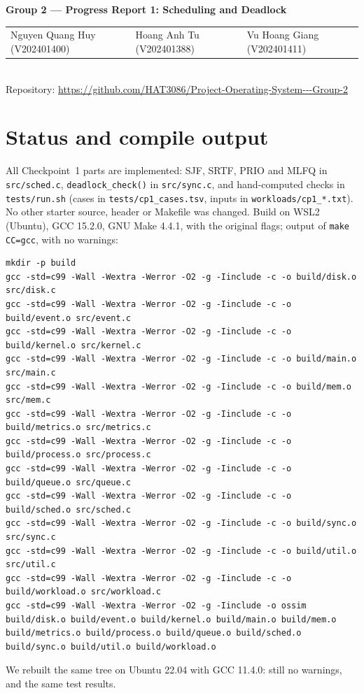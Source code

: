 \documentclass[10pt,a4paper]{article}
\newcommand{\code}[1]{\texttt{#1}}
\begin{document}
\begin{center}
{\Large\bfseries Group 2 --- Progress Report 1: Scheduling and Deadlock}\\[3pt]
\begin{tabular}{lll}
Nguyen Quang Huy (V202401400) & Hoang Anh Tu (V202401388) & Vu Hoang Giang (V202401411)
\end{tabular}\\[2pt]
Repository: \url{https://github.com/HAT3086/Project-Operating-System---Group-2}
\end{center}
\vspace{-6pt}

\section{Status and compile output}
All Checkpoint~1 parts are implemented: SJF, SRTF, PRIO and MLFQ in \code{src/sched.c},
\code{deadlock\_check()} in \code{src/sync.c}, and hand-computed checks in \code{tests/run.sh}
(cases in \code{tests/cp1\_cases.tsv}, inputs in \code{workloads/cp1\_*.txt}).
No other starter source, header or Makefile was changed. Build on WSL2 (Ubuntu), GCC 15.2.0, GNU Make 4.4.1, with the original
flags; output of \code{make CC=gcc}, with no warnings:
\begin{lstlisting}
mkdir -p build
gcc -std=c99 -Wall -Wextra -Werror -O2 -g -Iinclude -c -o build/disk.o src/disk.c
gcc -std=c99 -Wall -Wextra -Werror -O2 -g -Iinclude -c -o build/event.o src/event.c
gcc -std=c99 -Wall -Wextra -Werror -O2 -g -Iinclude -c -o build/kernel.o src/kernel.c
gcc -std=c99 -Wall -Wextra -Werror -O2 -g -Iinclude -c -o build/main.o src/main.c
gcc -std=c99 -Wall -Wextra -Werror -O2 -g -Iinclude -c -o build/mem.o src/mem.c
gcc -std=c99 -Wall -Wextra -Werror -O2 -g -Iinclude -c -o build/metrics.o src/metrics.c
gcc -std=c99 -Wall -Wextra -Werror -O2 -g -Iinclude -c -o build/process.o src/process.c
gcc -std=c99 -Wall -Wextra -Werror -O2 -g -Iinclude -c -o build/queue.o src/queue.c
gcc -std=c99 -Wall -Wextra -Werror -O2 -g -Iinclude -c -o build/sched.o src/sched.c
gcc -std=c99 -Wall -Wextra -Werror -O2 -g -Iinclude -c -o build/sync.o src/sync.c
gcc -std=c99 -Wall -Wextra -Werror -O2 -g -Iinclude -c -o build/util.o src/util.c
gcc -std=c99 -Wall -Wextra -Werror -O2 -g -Iinclude -c -o build/workload.o src/workload.c
gcc -std=c99 -Wall -Wextra -Werror -O2 -g -Iinclude -o ossim build/disk.o build/event.o build/kernel.o build/main.o build/mem.o build/metrics.o build/process.o build/queue.o build/sched.o build/sync.o build/util.o build/workload.o
\end{lstlisting}
We rebuilt the same tree on Ubuntu 22.04 with GCC 11.4.0: still no warnings, and the same test results.
\end{document}

